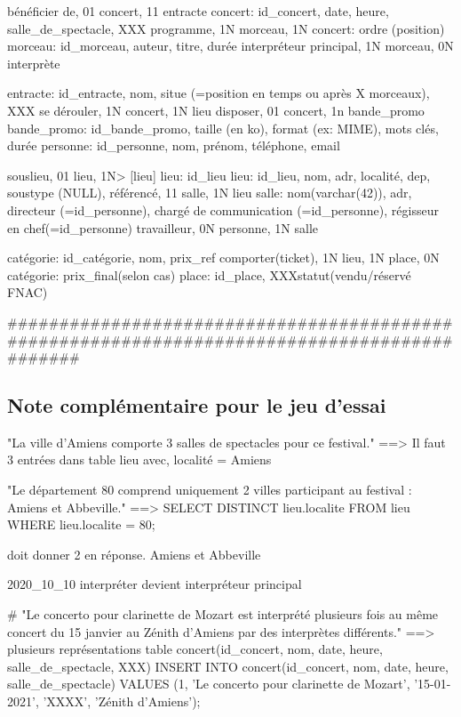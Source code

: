 \documentclass[12pt,a4paper]{article}
\begin{document}
{bénéficier de, 01 concert, 11 entracte
concert: id_concert, date, heure, salle_de_spectacle, XXX
programme, 1N morceau, 1N concert: ordre (position)
morceau: id_morceau, auteur, titre, durée
interpréteur principal, 1N morceau, 0N interprète

entracte: id_entracte, nom, situe (=position en temps ou après X morceaux), XXX
se dérouler, 1N concert, 1N lieu
disposer, 01 concert, 1n bande_promo
bande_promo: id_bande_promo, taille (en ko), format (ex: MIME), mots clés, durée
personne: id_personne, nom, prénom, téléphone, email

souslieu, 01 lieu,   1N> [lieu] lieu: id_lieu
lieu: id_lieu, nom, adr, localité, dep, soustype (NULL),
référencé, 11 salle, 1N lieu
salle: nom(varchar(42)), adr, directeur (=id_personne), chargé de communication (=id_personne), régisseur en chef(=id_personne)
travailleur, 0N personne, 1N salle

catégorie: id_catégorie, nom, prix_ref
comporter(ticket), 1N lieu, 1N place, 0N catégorie: prix_final(selon cas)
place: id_place, XXXstatut(vendu/réservé FNAC)

#############################################################################################




\subsection{Note complémentaire pour le jeu d'essai}


"La ville d'Amiens comporte 3 salles de spectacles pour ce festival."
==> Il faut 3 entrées dans table lieu avec, localité = Amiens



"Le département 80 comprend uniquement 2 villes participant au festival : Amiens et Abbeville."
==> 
SELECT DISTINCT lieu.localite
FROM lieu
WHERE lieu.localite = 80;

doit donner 2 en réponse. Amiens et Abbeville


2020_10_10 
interpréter devient interpréteur principal

# "Le concerto pour clarinette de Mozart est interprété plusieurs fois au même concert du 15 janvier au Zénith d'Amiens par des interprètes différents."
==> plusieurs représentations 
table concert(id_concert, nom, date, heure, salle_de_spectacle, XXX)
INSERT INTO concert(id_concert, nom, date, heure, salle_de_spectacle) VALUES (1, 'Le concerto pour clarinette de Mozart', '15-01-2021', 'XXXX', 'Zénith d'Amiens');

}
\end{document}
